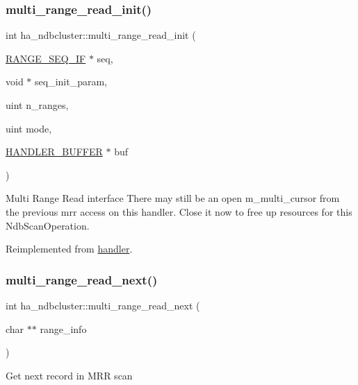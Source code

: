 \subsubsection{\texorpdfstring{multi\+\_\+range\+\_\+read\+\_\+init()}{multi\_range\_read\_init()}}
{\footnotesize\ttfamily int ha\+\_\+ndbcluster\+::multi\+\_\+range\+\_\+read\+\_\+init (\begin{DoxyParamCaption}\item[{\mbox{\hyperlink{structst__range__seq__if}{R\+A\+N\+G\+E\+\_\+\+S\+E\+Q\+\_\+\+IF}} $\ast$}]{seq,  }\item[{void $\ast$}]{seq\+\_\+init\+\_\+param,  }\item[{uint}]{n\+\_\+ranges,  }\item[{uint}]{mode,  }\item[{\mbox{\hyperlink{structst__handler__buffer}{H\+A\+N\+D\+L\+E\+R\+\_\+\+B\+U\+F\+F\+ER}} $\ast$}]{buf }\end{DoxyParamCaption})\hspace{0.3cm}{\ttfamily [virtual]}}

Multi Range Read interface There may still be an open m\+\_\+multi\+\_\+cursor from the previous mrr access on this handler. Close it now to free up resources for this Ndb\+Scan\+Operation.

Reimplemented from \mbox{\hyperlink{classhandler_a33e8899f4bae262b6b91c7284f1d946e}{handler}}.

\mbox{\label{classha__ndbcluster_a63ab7aa4c5bedaae4a2edb452da67fc8}} 
\subsubsection{\texorpdfstring{multi\+\_\+range\+\_\+read\+\_\+next()}{multi\_range\_read\_next()}}
{\footnotesize\ttfamily int ha\+\_\+ndbcluster\+::multi\+\_\+range\+\_\+read\+\_\+next (\begin{DoxyParamCaption}\item[{char $\ast$$\ast$}]{range\+\_\+info }\end{DoxyParamCaption})\hspace{0.3cm}{\ttfamily [virtual]}}

Get next record in M\+RR scan

